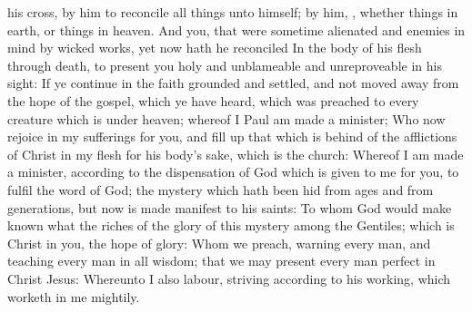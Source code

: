 {his
cross,
by
him to
reconcile all
things
unto
himself;
by
him,
{},
whether
{}
things
in
earth,
or
things
in
heaven.
And
you, that
were
sometime
alienated
and
enemies
in
{}
mind
by
wicked
works,
yet
now hath he
reconciled
In the
body of
his
flesh
through
death, to
present
you
holy
and
unblameable
and
unreproveable
in
his
sight:
If ye continue
in the
faith
grounded
and
settled,
and
{}
not moved
away
from the
hope of the
gospel,
which ye have
heard,
{} which was
preached
to
every
creature which is
under
heaven;
whereof
I
Paul am
made a
minister;
Who
now
rejoice
in
my
sufferings
for
you,
and fill
up that which is
behind of the
afflictions of
Christ
in
my
flesh
for
his
body’s
sake,
which
is the
church:
Whereof
I am
made a
minister, according
to the
dispensation of
God which is
given to
me
for
you, to
fulfil the
word of
God;
 the
mystery which hath been
hid
from
ages
and
from
generations,
but
now is made
manifest
to
his
saints:
To
whom
God
would make
known
what
{} the
riches of the
glory of
this
mystery
among the
Gentiles;
which
is
Christ
in
you, the
hope of
glory:
Whom
we
preach,
warning
every
man,
and
teaching
every
man
in
all
wisdom;
that we may
present
every
man
perfect
in
Christ
Jesus:
Whereunto
I
also
labour,
striving according
to
his
working, which
worketh
in
me
mightily.

}

